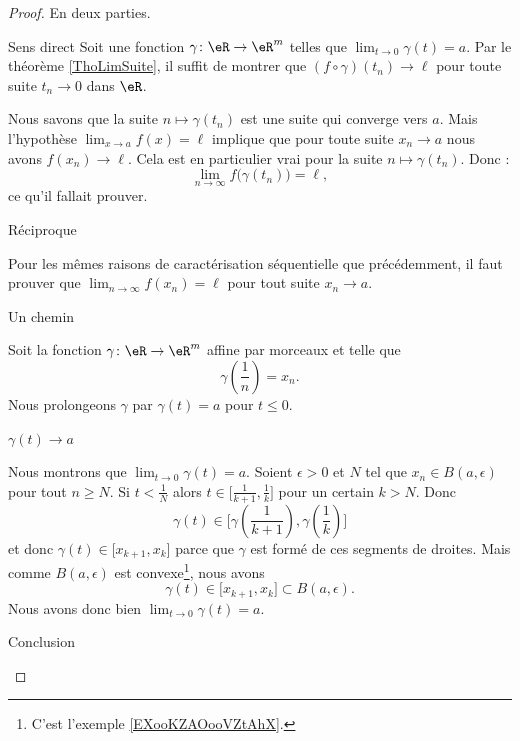 \begin{proof}
    En deux parties.
    \begin{subproof}
        \item[Sens direct]
            Soit une fonction \( \gamma\colon \eR\to \eR^m\) telles que \( \lim_{t\to 0} \gamma(t)=a\). Par le théorème \ref{ThoLimSuite}, il suffit de montrer que \( (f\circ\gamma)(t_n)\to\ell\) pour toute suite \( t_n\to 0\) dans \( \eR\).

            Nous savons que la suite \( n\mapsto \gamma(t_n)\) est une suite qui converge vers \( a\). Mais l'hypothèse \( \lim_{x\to a} f(x)=\ell\) implique que pour toute suite \( x_n\to a\) nous avons \( f(x_n)\to \ell\). Cela est en particulier vrai pour la suite \( n\mapsto \gamma(t_n)\). Donc :
            \begin{equation}
                \lim_{n\to \infty} f\big( \gamma(t_n) \big)=\ell,
            \end{equation}
            ce qu'il fallait prouver.
        \item[Réciproque]

            Pour les mêmes raisons de caractérisation séquentielle que précédemment, il faut prouver que \( \lim_{n\to \infty} f(x_n)=\ell\) pour tout suite \( x_n\to a\).
            
            \begin{subproof}
                \item[Un chemin]

                    Soit la fonction \( \gamma\colon \eR\to \eR^m\) affine par morceaux et telle que 
                    \begin{equation}
                        \gamma\left( \frac{1}{ n } \right)=x_n.
                    \end{equation}
                    Nous prolongeons \( \gamma\) par \( \gamma(t)=a\) pour \( t\leq 0\).

                \item[\( \gamma(t)\to a\)]

                    Nous montrons que \( \lim_{t\to 0} \gamma(t)=a\). Soient \( \epsilon>0\) et \( N\) tel que \( x_n\in B(a,\epsilon)\) pour tout \( n\geq N\). Si \( t<\frac{1}{ N }\) alors \( t\in\mathopen[ \frac{1}{ k+1 } , \frac{1}{ k } \mathclose]\) pour un certain \( k>N\). Donc
                    \begin{equation}
                        \gamma(t)\in\mathopen[ \gamma(\frac{1}{ k+1 }) , \gamma(\frac{1}{ k }) \mathclose]
                    \end{equation}
                    et donc \( \gamma(t)\in\mathopen[ x_{k+1} , x_k \mathclose]\) parce que \( \gamma\) est formé de ces segments de droites. Mais comme \( B(a,\epsilon)\) est convexe\footnote{C'est l'exemple \ref{EXooKZAOooVZtAhX}.}, nous avons 
                    \begin{equation}
                        \gamma(t)\in\mathopen[ x_{k+1} , x_k \mathclose]\subset B(a,\epsilon).
                    \end{equation}
                    Nous avons donc bien \( \lim_{t\to 0} \gamma(t)=a\).
                \item[Conclusion]


\end{subproof}
\end{subproof}
\end{proof}
